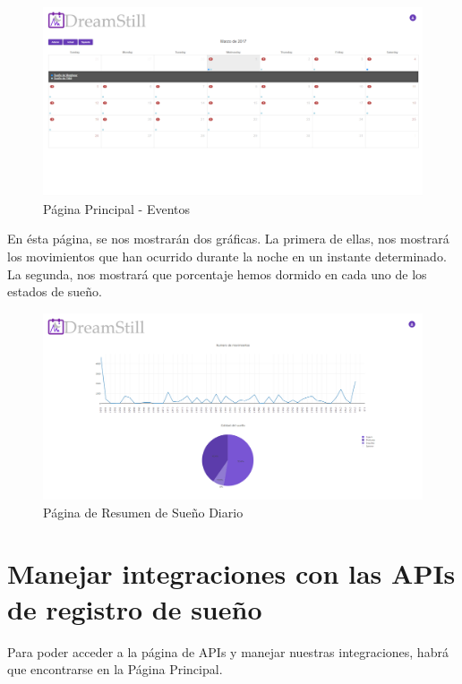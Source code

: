 \documentclass[11pt,openany]{book}
\begin{document}
\begin{figure}[H]
\centering
\includegraphics[totalheight=6cm]{manualUsuario/eventos.png}
\caption{Página Principal - Eventos}
\end{figure}

En ésta página, se nos mostrarán dos gráficas. La primera de ellas, nos mostrará los movimientos que han ocurrido durante la noche en un instante determinado. La segunda, nos mostrará que porcentaje hemos dormido en cada uno de los estados de sueño.

\begin{figure}[H]
\centering
\includegraphics[totalheight=6cm]{manualUsuario/resumenSue_oDiario.png}
\caption{Página de Resumen de Sueño Diario}
\end{figure}

\section{Manejar integraciones con las APIs de registro de sueño}

Para poder acceder a la página de APIs y manejar nuestras integraciones, habrá que encontrarse en la Página Principal.
\end{document}
